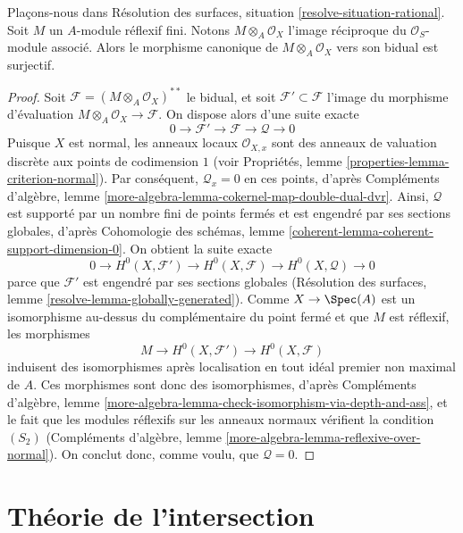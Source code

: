 \begin{lemma}
\label{lemma-double-dual-rational}
Plaçons-nous dans Résolution des surfaces, situation
\ref{resolve-situation-rational}.
Soit $M$ un $A$-module réflexif fini. Notons
$M \otimes_A \mathcal{O}_X$ l'image réciproque du
$\mathcal{O}_S$-module associé. Alors le morphisme canonique de
$M \otimes_A \mathcal{O}_X$ vers son bidual est surjectif.
\end{lemma}

\begin{proof}
Soit $\mathcal{F} = (M \otimes_A \mathcal{O}_X)^{**}$ le bidual, et soit
$\mathcal{F}' \subset \mathcal{F}$ l'image du morphisme d'évaluation
$M \otimes_A \mathcal{O}_X \to \mathcal{F}$. On dispose alors d'une suite
exacte
$$
0 \to \mathcal{F}' \to \mathcal{F} \to \mathcal{Q} \to 0
$$
Puisque $X$ est normal, les anneaux locaux $\mathcal{O}_{X, x}$ sont des
anneaux de valuation discrète aux points de codimension $1$ (voir
Propriétés, lemme \ref{properties-lemma-criterion-normal}).
Par conséquent, $\mathcal{Q}_x = 0$ en ces points, d'après
Compléments d'algèbre, lemme
\ref{more-algebra-lemma-cokernel-map-double-dual-dvr}.
Ainsi, $\mathcal{Q}$ est supporté par un nombre fini de points fermés et est
engendré par ses sections globales, d'après Cohomologie des schémas, lemme
\ref{coherent-lemma-coherent-support-dimension-0}.
On obtient la suite exacte
$$
0 \to H^0(X, \mathcal{F}') \to H^0(X, \mathcal{F}) \to H^0(X, \mathcal{Q}) \to 0
$$
parce que $\mathcal{F}'$ est engendré par ses sections globales
(Résolution des surfaces, lemme
\ref{resolve-lemma-globally-generated}).
Comme $X \to \Spec(A)$ est un isomorphisme au-dessus du complémentaire du
point fermé et que $M$ est réflexif, les morphismes
$$
M \to H^0(X, \mathcal{F}') \to H^0(X, \mathcal{F})
$$
induisent des isomorphismes après localisation en tout idéal premier non
maximal de $A$. Ces morphismes sont donc des isomorphismes, d'après
Compléments d'algèbre, lemme
\ref{more-algebra-lemma-check-isomorphism-via-depth-and-ass},
et le fait que les modules réflexifs sur les anneaux normaux vérifient la
condition $(S_2)$ (Compléments d'algèbre, lemme
\ref{more-algebra-lemma-reflexive-over-normal}).
On conclut donc, comme voulu, que $\mathcal{Q} = 0$.
\end{proof}


\section{Théorie de l'intersection}
\label{section-intersection-theory}

